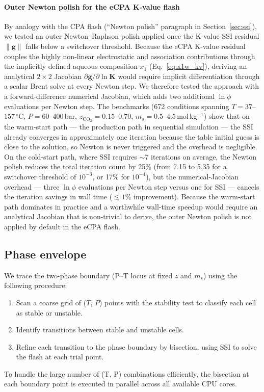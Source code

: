 \documentclass[preprint,12pt,authoryear]{elsarticle}
\begin{document}
\paragraph{Outer Newton polish for the eCPA K-value flash}
By analogy with the CPA flash (``Newton polish'' paragraph in Section~\ref{sec:ssi}), we tested an
outer Newton--Raphson polish applied once the K-value SSI residual
$\|\mathbf{g}\|$ falls below a switchover threshold.
Because the eCPA K-value residual couples the highly non-linear electrostatic
and association contributions through the implicitly defined aqueous composition
$x_1$ (Eq.~\eqref{eq:x1w_kv}), deriving an analytical $2\times 2$ Jacobian
$\partial\mathbf{g}/\partial\ln\mathbf{K}$ would require implicit differentiation
through a scalar Brent solve at every Newton step.
We therefore tested the approach with a forward-difference numerical Jacobian,
which adds two additional $\ln \phi $ evaluations per Newton step.
The benchmarks (672 conditions spanning $T = 37$--$157\,^\circ$C, $P = 60$--$400\,$bar,
$z_{\text{CO}_2} = 0.15$--$0.70$, $m_s = 0.5$--$4.5\,$mol\,kg$^{-1}$) show
that on the warm-start path — the production path in sequential simulation —
the SSI already converges in approximately one iteration because the table
initial guess is close to the solution, so Newton is never triggered and the
overhead is negligible.
On the cold-start path, where SSI requires $\sim$7 iterations on average,
the Newton polish reduces the total iteration count by 25\% (from 7.15 to 5.35
for a switchover threshold of $10^{-3}$, or 17\% for $10^{-4}$), but the
numerical-Jacobian overhead — three $\ln \phi $ evaluations per Newton step versus one
for SSI — cancels the iteration savings in wall time ($\lesssim 1\%$
improvement).
Because the warm-start path dominates in practice and a worthwhile wall-time
speedup would require an analytical Jacobian that is non-trivial to derive,
the outer Newton polish is not applied by default in the eCPA flash.

\subsection{Phase envelope}
\label{sec:envelope}

We trace the two-phase boundary (P--T locus at fixed $z$ and $m_s$) using the following
procedure:
\begin{enumerate}
  \item Scan a coarse grid of ($T$, $P$) points with the stability test to classify each
        cell as stable or unstable.
  \item Identify transitions between stable and unstable cells.
  \item Refine each transition to the phase boundary by bisection, using SSI
        to solve the flash at each trial point.
\end{enumerate}
To handle the large number of (T, P) combinations efficiently, the bisection at each
boundary point is executed in parallel across all available CPU cores.
\end{document}
